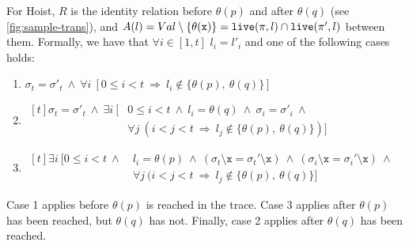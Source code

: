 \begin{myproof}
For Hoist, $R$ is the identity relation before $\theta(p)$ and after $\theta(q)$ (see \myfigure\ref{fig:sample-trans}), and $A(l)=Val\setminus\{\theta(\text{${\tt x}$})\}=\text{${\tt live}$}(\pi,l)\cap \text{${\tt live}$}(\pi',l)$ between them. Formally, we have that $\forall i\in[1,t]$ $l_i=l'_i$ and one of the following cases holds:
\begin{enumerate}
 \item $\sigma_t=\sigma'_t ~\wedge~ \forall i~[0\leq i<t ~\Rightarrow~ l_i \notin \{\theta(p),~\theta(q)\}]$
 \item $\begin{aligned}[t]
\sigma_t=\sigma'_t ~\wedge~ \exists i~[&0\leq i<t ~\wedge~ l_i=\theta(q) ~\wedge~ \sigma_i=\sigma'_i ~\wedge\\
&\forall j~(i<j<t ~\Rightarrow~ l_j \notin \{\theta(p),~\theta(q)\})]
       \end{aligned}$
 \item $\begin{aligned}[t] 
\exists i~[0\leq i<t ~\wedge~ &l_i=\theta(p) ~\wedge~ (\sigma_t\setminus\texttt{x}=\sigma_t'\setminus\texttt{x}) ~\wedge~ (\sigma_i\setminus\texttt{x}=\sigma_i'\setminus\texttt{x}) ~\wedge\\
&\forall j~(i<j<t ~\Rightarrow~ l_j \notin \{\theta(p),~\theta(q)\}]
       \end{aligned}$
\end{enumerate}

\noindent Case 1 applies before $\theta(p)$ is reached in the trace. Case 3 applies after $\theta(p)$ has been reached, but $\theta(q)$ has not. Finally, case 2 applies after $\theta(q)$ has been reached.
\end{myproof}